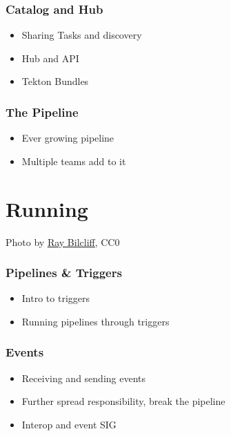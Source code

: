 \documentclass[aspectratio=169,11pt,hyperref={colorlinks=true}]{beamer}
\begin{document}
\begin{grayframe}
  \frametitle{Catalog and Hub}
  \begin{itemize}
    \item Sharing Tasks and discovery
    \item Hub and API
    \item Tekton Bundles
  \end{itemize}
\end{grayframe}

\begin{grayframe}
  \frametitle{The Pipeline}
  \begin{itemize}
    \item Ever growing pipeline
    \item Multiple teams add to it
  \end{itemize}
\end{grayframe}

\section{Running}

\begin{sectionwithpic}{Photo by \href{https://www.pexels.com/@raybilcliff}{\underline{Ray Bilcliff}}, CC0}
\end{sectionwithpic}


\begin{grayframe}
  \frametitle{Pipelines \& Triggers}
  \begin{itemize}
    \item Intro to triggers
    \item Running pipelines through triggers
  \end{itemize}
\end{grayframe}

\begin{grayframe}
  \frametitle{Events}
  \begin{itemize}
    \item Receiving and sending events
    \item Further spread responsibility, break the pipeline
    \item Interop and event SIG
  \end{itemize}
\end{grayframe}
\end{document}
